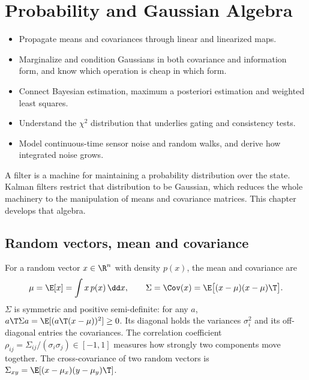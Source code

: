 \chapter{Probability and Gaussian Algebra}
\label{ch:prob}

\begin{objectives}
\begin{itemize}
  \item Propagate means and covariances through linear and linearized maps.
  \item Marginalize and condition Gaussians in both covariance and information form, and know which
        operation is cheap in which form.
  \item Connect Bayesian estimation, maximum a posteriori estimation and weighted least squares.
  \item Understand the $\chi^2$ distribution that underlies gating and consistency tests.
  \item Model continuous-time sensor noise and random walks, and derive how integrated noise grows.
\end{itemize}
\end{objectives}

A filter is a machine for maintaining a probability distribution over the state. Kalman filters
restrict that distribution to be Gaussian, which reduces the whole machinery to the manipulation of
means and covariance matrices. This chapter develops that algebra.

\section{Random vectors, mean and covariance}

For a random vector $x \in \R^n$ with density $p(x)$, the mean and covariance are
\begin{equation}
  \mu = \E[x] = \int x\, p(x)\, \dd x, \qquad
  \Sigma = \Cov(x) = \E\big[(x - \mu)(x - \mu)\T\big].
\end{equation}
$\Sigma$ is symmetric and positive semi-definite: for any $a$,
$a\T\Sigma a = \E[(a\T(x - \mu))^2] \ge 0$. Its diagonal holds the variances $\sigma_i^2$ and its
off-diagonal entries the covariances. The correlation coefficient
$\rho_{ij} = \Sigma_{ij}/(\sigma_i\sigma_j) \in [-1, 1]$ measures how strongly two components move
together. The cross-covariance of two random vectors is
$\Sigma_{xy} = \E[(x - \mu_x)(y - \mu_y)\T]$.

